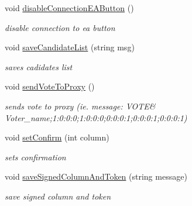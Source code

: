 \begin{DoxyCompactItemize}
void \hyperlink{class_voter_1_1_voter_a3e4b06943a2792a4c39de67e431ed6af}{disable\+Connection\+E\+A\+Button} ()
\begin{DoxyCompactList}\small\item\em disable connection to ea button \end{DoxyCompactList}\item 
void \hyperlink{class_voter_1_1_voter_a254426e5a240b96c33a8291b1ea75a87}{save\+Candidate\+List} (string msg)
\begin{DoxyCompactList}\small\item\em saves cadidates list \end{DoxyCompactList}\item 
void \hyperlink{class_voter_1_1_voter_a127f8b0f9a0e29e2153f95f669ed60bb}{send\+Vote\+To\+Proxy} ()
\begin{DoxyCompactList}\small\item\em sends vote to proxy (ie. message\+: V\+O\+T\+E\& Voter\+\_\+name;1\+:0\+:0\+:0;1\+:0\+:0\+:0;0\+:0\+:0\+:1;0\+:0\+:0\+:1;0\+:0\+:0\+:1) \end{DoxyCompactList}\item 
void \hyperlink{class_voter_1_1_voter_afd102d94d3bb4bc3e3b5369e0de299f8}{set\+Confirm} (int column)
\begin{DoxyCompactList}\small\item\em sets confirmation \end{DoxyCompactList}\item 
void \hyperlink{class_voter_1_1_voter_a533531950023f29d27d8f676f6a290bb}{save\+Signed\+Column\+And\+Token} (string message)
\begin{DoxyCompactList}\small\item\em save signed column and token \end{DoxyCompactList}\end{DoxyCompactItemize}
